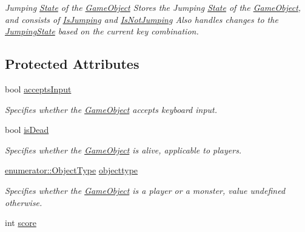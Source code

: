 \begin{DoxyCompactItemize}
\begin{DoxyCompactList}\small\item\em Jumping \hyperlink{classState}{State} of the \hyperlink{classGameObject}{Game\-Object} Stores the Jumping \hyperlink{classState}{State} of the \hyperlink{classGameObject}{Game\-Object}, and consists of \hyperlink{classIsJumping}{Is\-Jumping} and \hyperlink{classIsNotJumping}{Is\-Not\-Jumping} Also handles changes to the \hyperlink{classJumpingState}{Jumping\-State} based on the current key combination. \end{DoxyCompactList}\end{DoxyCompactItemize}
\subsection*{Protected Attributes}
\begin{DoxyCompactItemize}
\item 
\hypertarget{classGameObject_a5711f465dd7765919f5d8fe21673aaa3}{bool \hyperlink{classGameObject_a5711f465dd7765919f5d8fe21673aaa3}{accepts\-Input}}\label{classGameObject_a5711f465dd7765919f5d8fe21673aaa3}

\begin{DoxyCompactList}\small\item\em Specifies whether the \hyperlink{classGameObject}{Game\-Object} accepts keyboard input. \end{DoxyCompactList}\item 
\hypertarget{classGameObject_af684f5c351429efdb3bf376eba3beaf9}{bool \hyperlink{classGameObject_af684f5c351429efdb3bf376eba3beaf9}{is\-Dead}}\label{classGameObject_af684f5c351429efdb3bf376eba3beaf9}

\begin{DoxyCompactList}\small\item\em Specifies whether the \hyperlink{classGameObject}{Game\-Object} is alive, applicable to players. \end{DoxyCompactList}\item 
\hypertarget{classGameObject_ac4a4836d4e250af380475bf0791c4234}{\hyperlink{namespaceenumerator_a74b6f7a3aada6983503ce0f88ee90b29}{enumerator\-::\-Object\-Type} \hyperlink{classGameObject_ac4a4836d4e250af380475bf0791c4234}{objecttype}}\label{classGameObject_ac4a4836d4e250af380475bf0791c4234}

\begin{DoxyCompactList}\small\item\em Specifies whether the \hyperlink{classGameObject}{Game\-Object} is a player or a monster, value undefined otherwise. \end{DoxyCompactList}\item 
\hypertarget{classGameObject_a282f206512274bde89acc9b1a5870e6e}{int \hyperlink{classGameObject_a282f206512274bde89acc9b1a5870e6e}{score}}\label{classGameObject_a282f206512274bde89acc9b1a5870e6e}


\end{DoxyCompactItemize}
